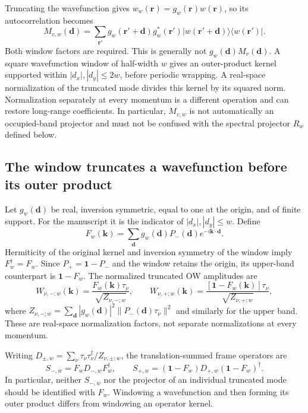 \documentclass[aps,prb,onecolumn,nofootinbib,superscriptaddress]{revtex4-2}
\newcommand{\id}{\mathbf{1}}
\newcommand{\bk}{\boldsymbol k}
\newcommand{\br}{\boldsymbol r}
\begin{document}
Truncating the wavefunction gives $w_w(\br)=g_w(\br)w(\br)$, so its autocorrelation becomes
\begin{equation}
 M_{v,w}(\boldsymbol d)=\sum_{\br'}
 g_w(\br'+\boldsymbol d)g_w^*(\br')
 |w(\br'+\boldsymbol d)\rangle\langle w(\br')|.
 \label{eq:window-autocorrelation}
\end{equation}
Both window factors are required. This is generally not $g_w(\boldsymbol d)M_v(\boldsymbol d)$. A square wavefunction window of half-width $w$ gives an outer-product kernel supported within $|d_x|,|d_y|\le2w$, before periodic wrapping. A real-space normalization of the truncated mode divides this kernel by its squared norm. Normalization separately at every momentum is a different operation and can restore long-range coefficients. In particular, $M_{v,w}$ is not automatically an occupied-band projector and must not be confused with the spectral projector $R_w$ defined below.

\subsection{The window truncates a wavefunction before its outer product}

Let $g_w(\boldsymbol d)$ be real, inversion symmetric, equal to one at the origin, and of finite support. For the manuscript it is the indicator of $|d_x|,|d_y|\le w$. Define
\begin{equation}
 F_w(\bk)=\sum_{\boldsymbol d}g_w(\boldsymbol d)P_-(\boldsymbol d)e^{-i\bk\cdot\boldsymbol d}.
 \label{eq:F}
\end{equation}
Hermiticity of the original kernel and inversion symmetry of the window imply $F_w^\dagger=F_w$. Since $P_+=\id-P_-$ and the window retains the origin, its upper-band counterpart is $\id-F_w$. The normalized truncated OW amplitudes are
\begin{equation}
 W_{\nu,-;w}(\bk)=\frac{F_w(\bk)\tau_\nu}{\sqrt{Z_{\nu,-;w}}},\qquad
 W_{\nu,+;w}(\bk)=\frac{[\id-F_w(\bk)]\tau_\nu}{\sqrt{Z_{\nu,+;w}}},
 \label{eq:OW}
\end{equation}
where $Z_{\nu,-;w}=\sum_{\boldsymbol d}|g_w(\boldsymbol d)|^2\|P_-(\boldsymbol d)\tau_\nu\|^2$ and similarly for the upper band. These are real-space normalization factors, not separate normalizations at every momentum.

Writing $D_{\pm,w}=\sum_\nu\tau_\nu\tau_\nu^\dagger/Z_{\nu,\pm;w}$, the translation-summed frame operators are
\begin{equation}
 S_{-,w}=F_wD_{-,w}F_w^\dagger,\qquad
 S_{+,w}=(\id-F_w)D_{+,w}(\id-F_w)^\dagger.
 \label{eq:frames-general}
\end{equation}
In particular, neither $S_{-,w}$ nor the projector of an individual truncated mode should be identified with $F_w$. Windowing a wavefunction and then forming its outer product differs from windowing an operator kernel.
\end{document}
